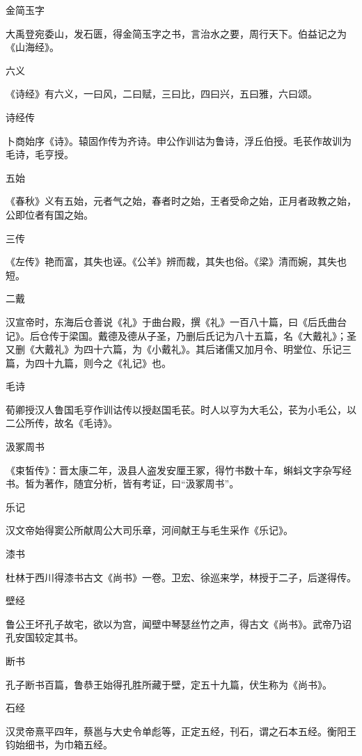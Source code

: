 \documentclass[a4paper,12pt,UTF8,twoside]{ctexbook}
\begin{document}
    金简玉字
    
    大禹登宛委山，发石匮，得金简玉字之书，言治水之要，周行天下。伯益记之为《山海经》。
    
    六义
    
    《诗经》有六义，一曰风，二曰赋，三曰比，四曰兴，五曰雅，六曰颂。
    
    诗经传
    
    卜商始序《诗》。辕固作传为齐诗。申公作训诂为鲁诗，浮丘伯授。毛苌作故训为毛诗，毛亨授。
    
    五始
    
    《春秋》义有五始，元者气之始，春者时之始，王者受命之始，正月者政教之始，公即位者有国之始。
    
    三传
    
    《左传》艳而富，其失也诬。《公羊》辨而裁，其失也俗。《梁》清而婉，其失也短。
    
    二戴
    
    汉宣帝时，东海后仓善说《礼》于曲台殿，撰《礼》一百八十篇，曰《后氏曲台记》。后仓传于梁国。戴德及德从子圣，乃删后氏记为八十五篇，名《大戴礼》；圣又删《大戴礼》为四十六篇，为《小戴礼》。其后诸儒又加月令、明堂位、乐记三篇，为四十九篇，则今之《礼记》也。
    
    毛诗
    
    荀卿授汉人鲁国毛亨作训诂传以授赵国毛苌。时人以亨为大毛公，苌为小毛公，以二公所传，故名《毛诗》。
    
    汲冢周书
    
    《束皙传》：晋太康二年，汲县人盗发安厘王冢，得竹书数十车，蝌蚪文字杂写经书。皙为著作，随宜分析，皆有考证，曰“汲冢周书”。
    
    乐记
    
    汉文帝始得窦公所献周公大司乐章，河间献王与毛生采作《乐记》。
    
    漆书
    
    杜林于西川得漆书古文《尚书》一卷。卫宏、徐巡来学，林授于二子，后遂得传。
    
    壁经
    
    鲁公王坏孔子故宅，欲以为宫，闻壁中琴瑟丝竹之声，得古文《尚书》。武帝乃诏孔安国较定其书。
    
    断书
    
    孔子断书百篇，鲁恭王始得孔胜所藏于壁，定五十九篇，伏生称为《尚书》。
    
    石经
    
    汉灵帝熹平四年，蔡邕与大史令单彪等，正定五经，刊石，谓之石本五经。衡阳王钧始细书，为巾箱五经。
    
\end{document}
